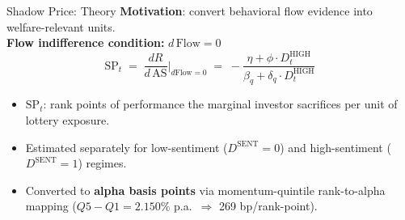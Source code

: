 \documentclass[10pt, aspectratio=169]{beamer}
\newcommand{\pct}{\%}
\begin{document}
\begin{frame}{Shadow Price: Theory}
  \textbf{Motivation}: convert behavioral flow evidence into welfare-relevant units.\\
  \vspace{6pt}
  \textbf{Flow indifference condition:} $d\,\text{Flow} = 0$
  \[
    \text{SP}_t \;=\; \frac{dR}{d\,\text{AS}}\bigg|_{d\text{Flow}=0}
    \;=\; -\frac{\eta + \phi \cdot D^{\text{HIGH}}_t}
                {\beta_q + \delta_q \cdot D^{\text{HIGH}}_t}
  \]
  \begin{itemize}\itemsep5pt
    \item $\text{SP}_t$: rank points of performance the marginal investor sacrifices
          per unit of lottery exposure.
    \item Estimated separately for low-sentiment ($D^{\text{SENT}}=0$) and
          high-sentiment ($D^{\text{SENT}}=1$) regimes.
    \item Converted to \textbf{alpha basis points} via momentum-quintile rank-to-alpha
          mapping ($Q5-Q1 = 2.150\pct$ p.a.\ $\Rightarrow$ 269 bp/rank-point).
  \end{itemize}
\end{frame}
\end{document}
